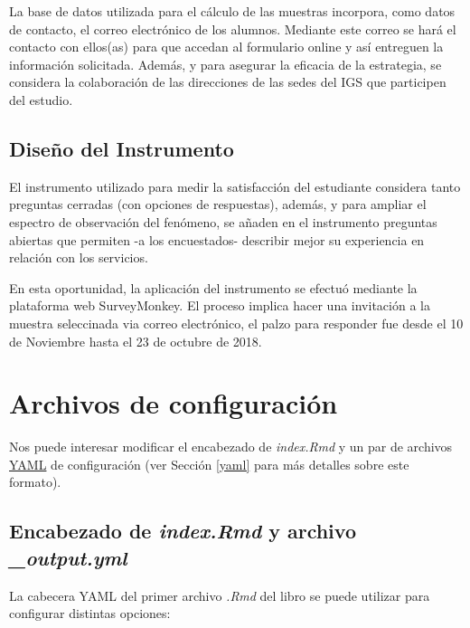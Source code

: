 \documentclass[]{book}
\theoremstyle{definition}
\theoremstyle{definition}
\theoremstyle{definition}
\theoremstyle{remark}
\begin{document}
La base de datos utilizada para el cálculo de las muestras incorpora,
como datos de contacto, el correo electrónico de los alumnos. Mediante
este correo se hará el contacto con ellos(as) para que accedan al
formulario online y así entreguen la información solicitada. Además, y
para asegurar la eficacia de la estrategia, se considera la colaboración
de las direcciones de las sedes del IGS que participen del estudio.

\section{Diseño del Instrumento}\label{diseno-del-instrumento}

El instrumento utilizado para medir la satisfacción del estudiante
considera tanto preguntas cerradas (con opciones de respuestas), además,
y para ampliar el espectro de observación del fenómeno, se añaden en el
instrumento preguntas abiertas que permiten -a los encuestados-
describir mejor su experiencia en relación con los servicios.

En esta oportunidad, la aplicación del instrumento se efectuó mediante
la plataforma web SurveyMonkey. El proceso implica hacer una invitación
a la muestra seleccinada via correo electrónico, el palzo para responder
fue desde el 10 de Noviembre hasta el 23 de octubre de 2018.

\chapter{Archivos de configuración}\label{archivos-de-configuracion}

Nos puede interesar modificar el encabezado de \emph{index.Rmd} y un par
de archivos \href{https://en.wikipedia.org/wiki/YAML}{YAML} de
configuración (ver Sección \ref{yaml} para más detalles sobre este
formato).

\section{\texorpdfstring{Encabezado de \emph{index.Rmd} y archivo
\emph{\_output.yml}}{Encabezado de index.Rmd y archivo \_output.yml}}\label{encabezado-de-index.rmd-y-archivo-_output.yml}

La cabecera YAML del primer archivo \emph{.Rmd} del libro se puede
utilizar para configurar distintas opciones:
\end{document}
